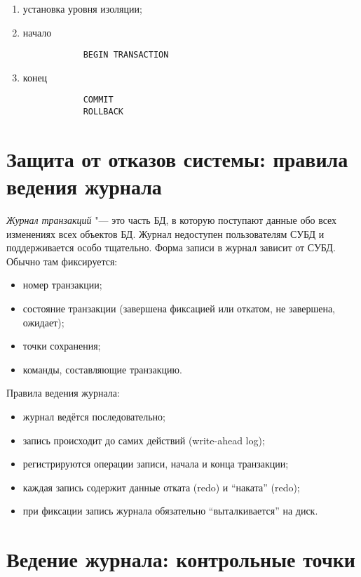 \begin{enumerate}
	\item установка уровня изоляции;
	\item начало
		\begin{verbatim}
			BEGIN TRANSACTION
		\end{verbatim}
	\item конец
		\begin{verbatim}
			COMMIT
			ROLLBACK
		\end{verbatim}
\end{enumerate}

\section{Защита от отказов системы: правила ведения журнала}

\begin{definition}
	\emph{Журнал транзакций} "--- это часть БД, в которую поступают данные обо всех изменениях всех объектов БД.
	Журнал недоступен пользователям СУБД и поддерживается особо тщательно.
	Форма записи в журнал зависит от СУБД.
	Обычно там фиксируется:
	\begin{itemize}
		\item номер транзакции;
		\item состояние транзакции (завершена фиксацией или откатом, не завершена, ожидает);
		\item точки сохранения;
		\item команды, составляющие транзакцию.
	\end{itemize}
\end{definition}

Правила ведения журнала:
\begin{itemize}
	\item журнал ведётся последовательно;
	\item запись происходит до самих действий (write-ahead log);
	\item регистрируются операции записи, начала и конца транзакции;
	\item каждая запись содержит данные отката (redo) и ``наката'' (redo);
	\item при фиксации запись журнала обязательно ``выталкивается'' на диск.
\end{itemize}

\section{Ведение журнала: контрольные точки}

